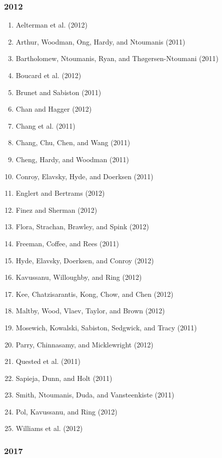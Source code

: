 \documentclass[english,man]{apa6}
\providecommand{\tightlist}{%
  \setlength{\itemsep}{0pt}\setlength{\parskip}{0pt}}
\begin{document}
\subsubsection{2012}\label{section-50}

\begin{enumerate}
\def\labelenumi{\arabic{enumi})}
\tightlist
\item
  Aelterman et al. (2012)
\item
  Arthur, Woodman, Ong, Hardy, and Ntoumanis (2011)
\item
  Bartholomew, Ntoumanis, Ryan, and Thøgersen-Ntoumani (2011)
\item
  Boucard et al. (2012)
\item
  Brunet and Sabiston (2011)
\item
  Chan and Hagger (2012)
\item
  Chang et al. (2011)
\item
  Chang, Chu, Chen, and Wang (2011)
\item
  Cheng, Hardy, and Woodman (2011)
\item
  Conroy, Elavsky, Hyde, and Doerksen (2011)
\item
  Englert and Bertrams (2012)
\item
  Finez and Sherman (2012)
\item
  Flora, Strachan, Brawley, and Spink (2012)
\item
  Freeman, Coffee, and Rees (2011)
\item
  Hyde, Elavsky, Doerksen, and Conroy (2012)
\item
  Kavussanu, Willoughby, and Ring (2012)
\item
  Kee, Chatzisarantis, Kong, Chow, and Chen (2012)
\item
  Maltby, Wood, Vlaev, Taylor, and Brown (2012)
\item
  Mosewich, Kowalski, Sabiston, Sedgwick, and Tracy (2011)
\item
  Parry, Chinnasamy, and Micklewright (2012)
\item
  Quested et al. (2011)
\item
  Sapieja, Dunn, and Holt (2011)
\item
  Smith, Ntoumanis, Duda, and Vansteenkiste (2011)
\item
  Pol, Kavussanu, and Ring (2012)
\item
  Williams et al. (2012)
\end{enumerate}

\subsubsection{2017}\label{section-51}
\end{document}

